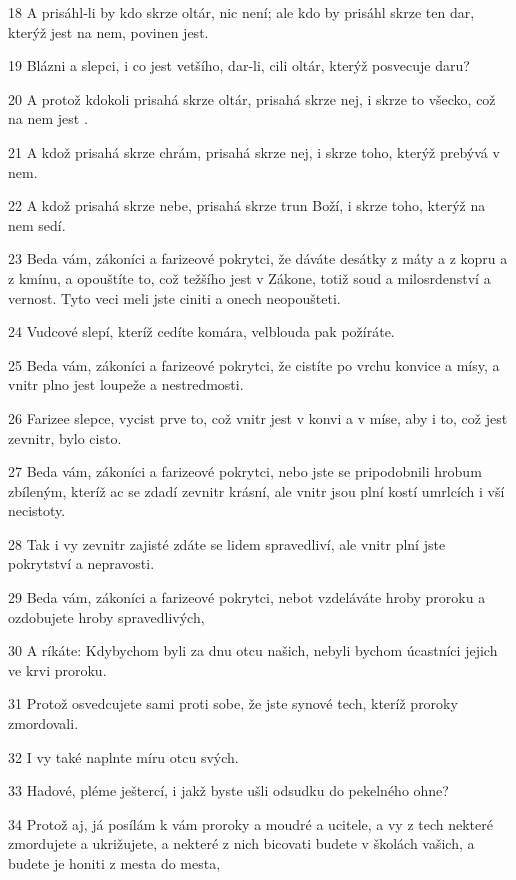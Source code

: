 \par 18 A prisáhl-li by kdo skrze oltár, nic není; ale kdo by prisáhl skrze ten dar, kterýž jest na nem, povinen jest.
\par 19 Blázni a slepci, i co jest vetšího, dar-li, cili oltár, kterýž posvecuje daru?
\par 20 A protož kdokoli prisahá skrze oltár, prisahá skrze nej, i skrze to všecko, což na nem jest .
\par 21 A kdož prisahá skrze chrám, prisahá skrze nej, i skrze toho, kterýž prebývá v nem.
\par 22 A kdož prisahá skrze nebe, prisahá skrze trun Boží, i skrze toho, kterýž na nem sedí.
\par 23 Beda vám, zákoníci a farizeové pokrytci, že dáváte desátky z máty a z kopru a z kmínu, a opouštíte to, což težšího jest v Zákone, totiž soud a milosrdenství a vernost. Tyto veci meli jste ciniti a onech neopoušteti.
\par 24 Vudcové slepí, kteríž cedíte komára, velblouda pak požíráte.
\par 25 Beda vám, zákoníci a farizeové pokrytci, že cistíte po vrchu konvice a mísy, a vnitr plno jest loupeže a nestredmosti.
\par 26 Farizee slepce, vycist prve to, což vnitr jest v konvi a v míse, aby i to, což jest zevnitr, bylo cisto.
\par 27 Beda vám, zákoníci a farizeové pokrytci, nebo jste se pripodobnili hrobum zbíleným, kteríž ac se zdadí zevnitr krásní, ale vnitr jsou plní kostí umrlcích i vší necistoty.
\par 28 Tak i vy zevnitr zajisté zdáte se lidem spravedliví, ale vnitr plní jste pokrytství a nepravosti.
\par 29 Beda vám, zákoníci a farizeové pokrytci, nebot vzdeláváte hroby proroku a ozdobujete hroby spravedlivých,
\par 30 A ríkáte: Kdybychom byli za dnu otcu našich, nebyli bychom úcastníci jejich ve krvi proroku.
\par 31 Protož osvedcujete sami proti sobe, že jste synové tech, kteríž proroky zmordovali.
\par 32 I vy také naplnte míru otcu svých.
\par 33 Hadové, pléme ještercí, i jakž byste ušli odsudku do pekelného ohne?
\par 34 Protož aj, já posílám k vám proroky a moudré a ucitele, a vy z tech nekteré zmordujete a ukrižujete, a nekteré z nich bicovati budete v školách vašich, a budete je honiti z mesta do mesta,
